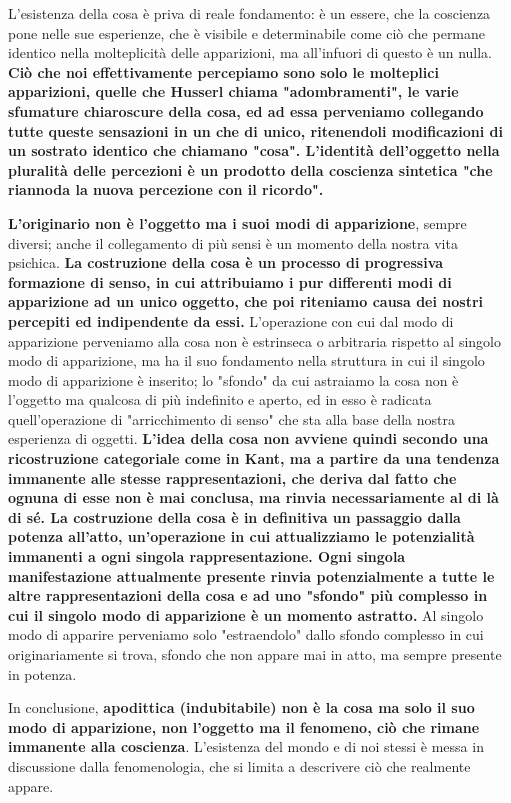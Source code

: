 L'esistenza della cosa è priva di reale fondamento:
è un essere, che la coscienza pone nelle sue
esperienze, che è visibile e determinabile
come ciò che permane identico nella molteplicità
delle apparizioni, ma all'infuori di questo è
un nulla.
\textbf{Ciò che noi effettivamente percepiamo sono
solo le molteplici apparizioni, quelle che
Husserl chiama "adombramenti", le varie
sfumature chiaroscure della cosa, ed ad essa
perveniamo collegando tutte queste sensazioni
in un che di unico, ritenendoli modificazioni di un sostrato identico che chiamano
"cosa".
L'identità dell'oggetto nella pluralità delle
percezioni è un prodotto della coscienza sintetica
"che riannoda la nuova percezione con il ricordo".}


\textbf{L'originario non è l'oggetto ma i suoi modi
di apparizione}, sempre diversi; anche il collegamento di più sensi è un momento della nostra vita
psichica.
\textbf{La costruzione della cosa è un processo di
progressiva formazione di senso, in cui
attribuiamo i pur differenti modi di
apparizione ad un unico oggetto, che poi
riteniamo causa dei nostri percepiti ed
indipendente da essi.}
L'operazione con cui dal modo di apparizione
perveniamo alla cosa non è estrinseca o arbitraria
rispetto al singolo modo di apparizione, ma ha il
suo fondamento nella struttura in cui il singolo
modo di apparizione è inserito; lo "sfondo" da cui astraiamo la cosa
non è l'oggetto ma qualcosa di più indefinito e aperto, ed in esso è radicata quell'operazione di "arricchimento di senso" che sta
alla base della nostra esperienza di oggetti.
\textbf{L'idea della cosa non avviene quindi secondo una
ricostruzione categoriale come in Kant,
ma a partire da una tendenza immanente
alle stesse rappresentazioni, che deriva dal
fatto che ognuna di esse non è mai
conclusa, ma rinvia necessariamente al
di là di sé. La costruzione della cosa è
in definitiva un passaggio dalla potenza
all'atto, un'operazione in cui attualizziamo
le potenzialità immanenti a ogni singola
rappresentazione.
Ogni singola manifestazione attualmente presente
rinvia potenzialmente a tutte le altre rappresentazioni della cosa e ad uno "sfondo" più
complesso in cui il singolo modo di apparizione è
un momento astratto.} Al singolo modo di
apparire perveniamo solo "estraendolo" dallo sfondo
complesso in cui originariamente si trova,
sfondo che non appare mai in atto, ma sempre
presente in potenza.

In conclusione, \textbf{apodittica (indubitabile) non è la cosa ma solo
il suo modo di apparizione, non l'oggetto
ma il fenomeno, ciò che rimane immanente
alla coscienza}. L'esistenza del mondo e
di noi stessi è messa in discussione dalla
fenomenologia, che si limita a descrivere ciò
che realmente appare.

